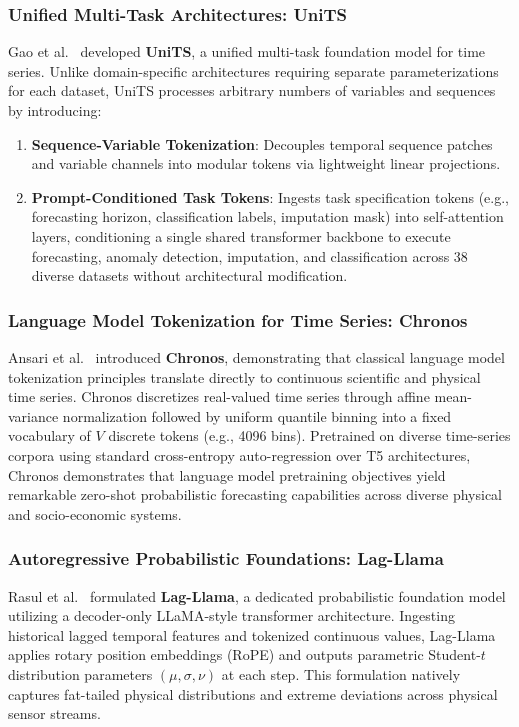 \subsubsection{Unified Multi-Task Architectures: UniTS}
Gao et al.~\cite{gao2024units} developed \textbf{UniTS}, a unified multi-task foundation model for time series. Unlike domain-specific architectures requiring separate parameterizations for each dataset, UniTS processes arbitrary numbers of variables and sequences by introducing:
\begin{enumerate}
    \item \textbf{Sequence-Variable Tokenization}: Decouples temporal sequence patches and variable channels into modular tokens via lightweight linear projections.
    \item \textbf{Prompt-Conditioned Task Tokens}: Ingests task specification tokens (e.g., forecasting horizon, classification labels, imputation mask) into self-attention layers, conditioning a single shared transformer backbone to execute forecasting, anomaly detection, imputation, and classification across 38 diverse datasets without architectural modification.
\end{enumerate}

\subsubsection{Language Model Tokenization for Time Series: Chronos}
Ansari et al.~\cite{ansari2024chronos} introduced \textbf{Chronos}, demonstrating that classical language model tokenization principles translate directly to continuous scientific and physical time series. Chronos discretizes real-valued time series through affine mean-variance normalization followed by uniform quantile binning into a fixed vocabulary of $V$ discrete tokens (e.g., 4096 bins). Pretrained on diverse time-series corpora using standard cross-entropy auto-regression over T5 architectures, Chronos demonstrates that language model pretraining objectives yield remarkable zero-shot probabilistic forecasting capabilities across diverse physical and socio-economic systems.

\subsubsection{Autoregressive Probabilistic Foundations: Lag-Llama}
Rasul et al.~\cite{rasul2024lagllama} formulated \textbf{Lag-Llama}, a dedicated probabilistic foundation model utilizing a decoder-only LLaMA-style transformer architecture. Ingesting historical lagged temporal features and tokenized continuous values, Lag-Llama applies rotary position embeddings (RoPE) and outputs parametric Student-$t$ distribution parameters $(\mu, \sigma, \nu)$ at each step. This formulation natively captures fat-tailed physical distributions and extreme deviations across physical sensor streams.

